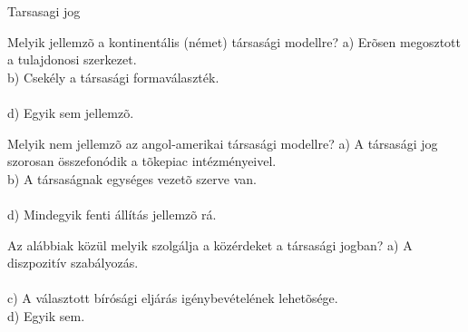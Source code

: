 \begin{frame}[plain]
\begin{tcolorbox}[center, colback={myyellow}, coltext={black}, colframe={myyellow}]
    { Tarsasagi jog}\\
\end{tcolorbox}
\end{frame}

\begin{frame}

\begin{tcolorbox}[title={60. Kérdés}]
Melyik jellemzõ a kontinentális (német) társasági modellre?
\tcblower
a) Erõsen megosztott a tulajdonosi szerkezet.\\
b) Csekély a társasági formaválaszték.\\
\\
d) Egyik sem jellemzõ.
\end{tcolorbox}

\begin{tcolorbox}[title={61. Kérdés}]
Melyik nem jellemzõ az angol-amerikai társasági modellre?
\tcblower
a) A társasági jog szorosan összefonódik a tõkepiac intézményeivel.\\
b) A társaságnak egységes vezetõ szerve van.\\
\\
d) Mindegyik fenti állítás jellemzõ rá.
\end{tcolorbox}

\begin{tcolorbox}[title={62. Kérdés}]
Az alábbiak közül melyik szolgálja a közérdeket a társasági jogban?
\tcblower
a) A diszpozitív szabályozás.\\
\\
c) A választott bírósági eljárás igénybevételének lehetõsége.\\
d) Egyik sem.
\end{tcolorbox}

\end{frame}


